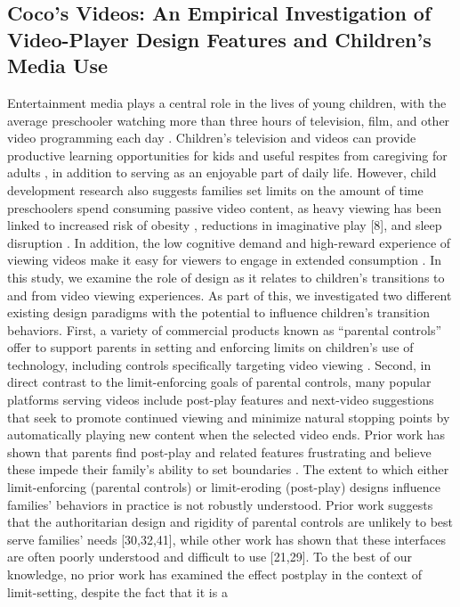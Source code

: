 \subsection{Coco’s Videos: An Empirical Investigation of Video-Player
Design Features and Children's Media Use }

Entertainment media plays a central role in the lives of young
children, with the average preschooler watching more than
three hours of television, film, and other video programming
each day . Children’s television and videos can provide productive learning opportunities for kids  and useful respites from caregiving for adults , in addition to
serving as an enjoyable part of daily life. However, child development research also suggests families set limits on the
amount of time preschoolers spend consuming passive video
content, as heavy viewing has been linked to increased risk
of obesity , reductions in imaginative play [8], and sleep
disruption . In addition, the low cognitive demand and
high-reward experience of viewing videos make it easy for
viewers to engage in extended consumption .
In this study, we examine the role of design as it relates to
children’s transitions to and from video viewing experiences.
As part of this, we investigated two different existing design
paradigms with the potential to influence children’s transition behaviors. First, a variety of commercial products
known as “parental controls” offer to support parents in setting and enforcing limits on children’s use of technology, including controls specifically targeting video viewing .
Second, in direct contrast to the limit-enforcing goals of parental controls, many popular platforms serving videos include post-play features and next-video suggestions that seek
to promote continued viewing and minimize natural stopping
points by automatically playing new content when the selected video ends. Prior work has shown that parents find
post-play and related features frustrating and believe these
impede their family’s ability to set boundaries .
The extent to which either limit-enforcing (parental controls)
or limit-eroding (post-play) designs influence families’ behaviors in practice is not robustly understood. Prior work
suggests that the authoritarian design and rigidity of parental
controls are unlikely to best serve families’ needs [30,32,41],
while other work has shown that these interfaces are often
poorly understood and difficult to use [21,29]. To the best of
our knowledge, no prior work has examined the effect postplay in the context of limit-setting, despite the fact that it is a
